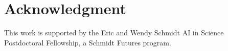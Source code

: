 \section*{Acknowledgment}

This work is supported by the Eric and Wendy Schmidt AI in Science Postdoctoral Fellowship, a Schmidt Futures program.
